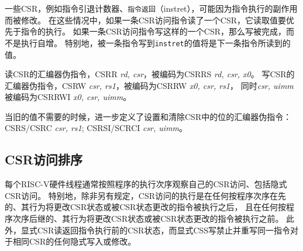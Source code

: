 一些CSR，例如指令引退计数器、{\tt 指令返回}（instret），可能因为指令执行的副作用而被修改。
在这些情况中，如果一条CSR访问指令读了一个CSR，它读取值要优先于指令的执行。
如果一条CSR访问指令写这样的一个CSR，那么写被完成，而不是执行自增。
特别地，被一条指令写到{\tt instret}的值将是下一条指令所读到的值。

读CSR的汇编器伪指令，CSRR {\em rd, csr}，被编码为CSRRS {\em rd, csr, x0}。
写CSR的汇编器伪指令，CSRW {\em csr, rs1}，被编码为CSRRW {\em x0, csr, rs1}，
同时{\em csr, uimm}被编码为CSRRWI {\em x0, csr, uimm}。

当旧的值不需要的时候，进一步定义了设置和清除CSR中的位的汇编器伪指令：CSRS/CSRC {\em csr, rs1}; CSRSI/SCRCI {\em csr, uimm}。


\subsection*{CSR访问排序}

每个RISC-V硬件线程通常按照程序的执行次序观察自己的CSR访问、包括隐式CSR访问。
特别地，除非另有规定，CSR访问的执行是在任何按程序次序在先的、其行为将更改CSR状态或被CSR状态更改的指令被执行之后，
且在任何按程序次序后继的、其行为将更改CSR状态或被CSR状态更改的指令被执行之前。
此外，显式CSR读返回指令执行前的CSR状态，而显式CSS写禁止并重写同一指令对于相同CSR的任何隐式写入或修改。


